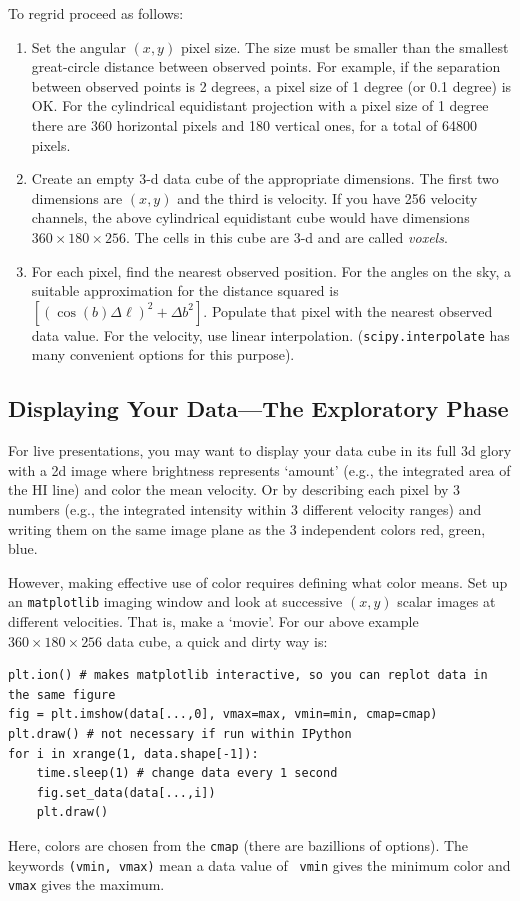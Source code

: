 \documentclass[psfig,preprint]{aastex}
\begin{document}
To regrid proceed as
follows: \begin{enumerate}

\item Set the angular $(x,y)$ pixel size. The size must be smaller than
  the smallest great-circle distance between observed points. For
  example, if the separation between observed points is 2 degrees, a
  pixel size of 1 degree (or 0.1 degree) is OK. For the cylindrical
  equidistant projection with a pixel size of 1 degree there are 360
  horizontal pixels and 180 vertical ones, for a total of 64800 pixels.

\item Create an empty 3-d data cube of the appropriate dimensions. The
  first two dimensions are $(x,y)$ and the third is velocity. If you
  have 256 velocity channels, the above cylindrical equidistant cube
  would have dimensions $360 \times 180 \times 256$. The cells in this
  cube are 3-d and are called {\it voxels}.

\item For each pixel, find the nearest observed position. For the angles
  on the sky, a suitable approximation for the distance squared is $[
    (\cos (b) \Delta \ell)^2 + \Delta b^2]$. Populate that pixel with
  the nearest observed data value. For the velocity, use linear
  interpolation.  ({\tt scipy.interpolate} has many convenient options for
  this purpose).

\end{enumerate}

\subsection{Displaying Your Data---The Exploratory Phase}

\noindent
For live presentations, you may want to display your data cube in its
full 3d glory with a 2d image where brightness represents `amount'
(e.g., the integrated area of the HI line) and color the mean
velocity. Or by describing each pixel by 3 numbers (e.g., the integrated
intensity within 3 different velocity ranges) and writing them on the
same image plane as the 3 independent colors red, green, blue.

However, making effective use of color requires defining what color
means.  Set up
an {\tt matplotlib} imaging window and look at successive $(x,y)$ scalar images at
different velocities. That is, make a `movie'. For our above example
$360 \times 180 \times 256$ data cube, a quick and dirty way
is: 

\begin{verbatim}
plt.ion() # makes matplotlib interactive, so you can replot data in the same figure
fig = plt.imshow(data[...,0], vmax=max, vmin=min, cmap=cmap)
plt.draw() # not necessary if run within IPython
for i in xrange(1, data.shape[-1]):
    time.sleep(1) # change data every 1 second
    fig.set_data(data[...,i])
    plt.draw()
\end{verbatim}

Here, colors are chosen from the {\tt cmap} (there are bazillions of options).
The keywords {\tt (vmin, vmax)} mean a data value of {\tt
  vmin} gives the minimum color and {\tt vmax} gives the maximum.
\end{document}
